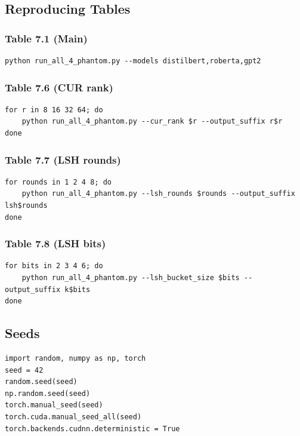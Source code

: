 \subsection{Reproducing Tables}

\subsubsection{Table 7.1 (Main)}

\begin{lstlisting}
python run_all_4_phantom.py --models distilbert,roberta,gpt2
\end{lstlisting}

\subsubsection{Table 7.6 (CUR rank)}

\begin{lstlisting}
for r in 8 16 32 64; do
    python run_all_4_phantom.py --cur_rank $r --output_suffix r$r
done
\end{lstlisting}

\subsubsection{Table 7.7 (LSH rounds)}

\begin{lstlisting}
for rounds in 1 2 4 8; do
    python run_all_4_phantom.py --lsh_rounds $rounds --output_suffix lsh$rounds
done
\end{lstlisting}

\subsubsection{Table 7.8 (LSH bits)}

\begin{lstlisting}
for bits in 2 3 4 6; do
    python run_all_4_phantom.py --lsh_bucket_size $bits --output_suffix k$bits
done
\end{lstlisting}

\subsection{Seeds}

\begin{lstlisting}
import random, numpy as np, torch
seed = 42
random.seed(seed)
np.random.seed(seed)
torch.manual_seed(seed)
torch.cuda.manual_seed_all(seed)
torch.backends.cudnn.deterministic = True
\end{lstlisting}

